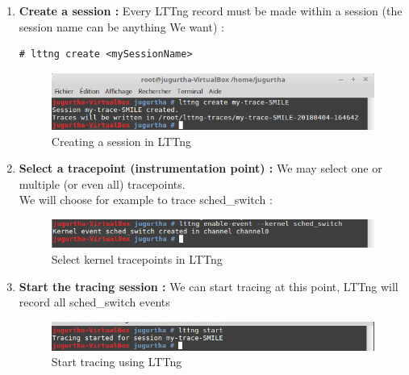 \begin{enumerate}
	\item \textbf{Create a session :} Every LTTng record must be made within a session (the session name can be anything We want) :
		\begin{lstlisting}[style=BashInputStyle]
# lttng create <mySessionName>
	\end{lstlisting}	

		\begin{figure}[H]
			\centering
        	\includegraphics[scale=0.32]{img/solution/create-session-lttng.png}
        	\caption{Creating a session in LTTng}
        	\label{Creating a session in LTTng}
    	\end{figure}	
	
	
	\item \textbf{Select a tracepoint (instrumentation point) : } We may select one or multiple (or even all) tracepoints.\\
We will choose for example to trace \og sched\_switch \fg :

		\begin{figure}[H]
			\centering
        	\includegraphics[scale=0.32]{img/solution/lttng-select-event.png}
        	\caption{Select kernel tracepoints in LTTng}
        	\label{Select kernel tracepoints in LTTng}
    	\end{figure}



	\item \textbf{Start the tracing session :} We can start tracing at this point, LTTng will record all \og sched\_switch \fg events
		\begin{figure}[H]
			\centering
        	\includegraphics[scale=0.32]{img/solution/lttng-start-tracing.png}
        	\caption{Start tracing using LTTng}
        	\label{Start tracing using LTTng}
    	\end{figure}



\end{enumerate}
